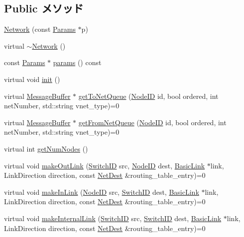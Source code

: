 \subsection*{Public メソッド}
\begin{DoxyCompactItemize}
\item 
\hyperlink{classNetwork_a1afbde22f88c23c384879624c885d0ef}{Network} (const \hyperlink{classNetwork_a5ebe6802acb5e6e05b54303c1004f080}{Params} $\ast$p)
\item 
virtual \hyperlink{classNetwork_a8a5c4f102e29b4f52af55a6d167c5990}{$\sim$Network} ()
\item 
const \hyperlink{classNetwork_a5ebe6802acb5e6e05b54303c1004f080}{Params} $\ast$ \hyperlink{classNetwork_acd3c3feb78ae7a8f88fe0f110a718dff}{params} () const 
\item 
virtual void \hyperlink{classNetwork_a02fd73d861ef2e4aabb38c0c9ff82947}{init} ()
\item 
virtual \hyperlink{classMessageBuffer}{MessageBuffer} $\ast$ \hyperlink{classNetwork_aeb27c17e088f115f8b5e3366c9ef8415}{getToNetQueue} (\hyperlink{TypeDefines_8hh_a83c14b4ae37e80071f6b3506a6c46151}{NodeID} id, bool ordered, int netNumber, std::string vnet\_\-type)=0
\item 
virtual \hyperlink{classMessageBuffer}{MessageBuffer} $\ast$ \hyperlink{classNetwork_a28233bfa034d11609e66d504bce62359}{getFromNetQueue} (\hyperlink{TypeDefines_8hh_a83c14b4ae37e80071f6b3506a6c46151}{NodeID} id, bool ordered, int netNumber, std::string vnet\_\-type)=0
\item 
virtual int \hyperlink{classNetwork_a7624554588ea569f360d6ea8e1cad409}{getNumNodes} ()
\item 
virtual void \hyperlink{classNetwork_a4e62c2a0e4a511dae2e9870a3d305719}{makeOutLink} (\hyperlink{TypeDefines_8hh_ac925a332c83eaf1e40e056e7a20ebcd8}{SwitchID} src, \hyperlink{TypeDefines_8hh_a83c14b4ae37e80071f6b3506a6c46151}{NodeID} dest, \hyperlink{classBasicLink}{BasicLink} $\ast$link, LinkDirection direction, const \hyperlink{classNetDest}{NetDest} \&routing\_\-table\_\-entry)=0
\item 
virtual void \hyperlink{classNetwork_a989337badc16737935316d1faa84a017}{makeInLink} (\hyperlink{TypeDefines_8hh_a83c14b4ae37e80071f6b3506a6c46151}{NodeID} src, \hyperlink{TypeDefines_8hh_ac925a332c83eaf1e40e056e7a20ebcd8}{SwitchID} dest, \hyperlink{classBasicLink}{BasicLink} $\ast$link, LinkDirection direction, const \hyperlink{classNetDest}{NetDest} \&routing\_\-table\_\-entry)=0
\item 
virtual void \hyperlink{classNetwork_adc0a708d423af0acbe045a50a46d7b03}{makeInternalLink} (\hyperlink{TypeDefines_8hh_ac925a332c83eaf1e40e056e7a20ebcd8}{SwitchID} src, \hyperlink{TypeDefines_8hh_ac925a332c83eaf1e40e056e7a20ebcd8}{SwitchID} dest, \hyperlink{classBasicLink}{BasicLink} $\ast$link, LinkDirection direction, const \hyperlink{classNetDest}{NetDest} \&routing\_\-table\_\-entry)=0

\end{DoxyCompactItemize}
